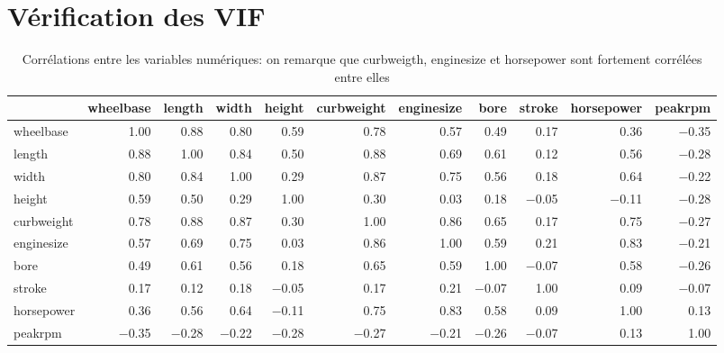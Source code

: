 \documentclass[11pt,a4paper]{article}
\begin{document}
\section{Vérification des VIF}
\begin{table}[h]
	\scriptsize
	\centering
	\begin{tabulary}{1\textwidth}{|L|R|R|R|R|R|R|R|R|R|R|}
	\hline
 &    wheelbase &    length &    width &    height &    curbweight &    enginesize &    bore &    stroke &    horsepower &    peakrpm\\\hline

wheelbase &    1.00 &    0.88 &    0.80 &    0.59 &    0.78 &    0.57 &    0.49 &    0.17 &    0.36 &    $-$0.35\\\hline
length &    0.88 &    1.00 &    0.84 &    0.50 &    0.88 &    0.69 &    0.61 &    0.12 &    0.56 &    $-$0.28\\\hline
width &    0.80 &    0.84 &    1.00 &    0.29 &    0.87 &    0.75 &    0.56 &    0.18 &    0.64 &    $-$0.22\\\hline
height &    0.59 &    0.50 &    0.29 &    1.00 &    0.30 &    0.03 &    0.18 &    $-$0.05 &    $-$0.11 &    $-$0.28\\\hline
curbweight &    0.78 &    0.88 &    0.87 &    0.30 &    1.00 &    0.86 &    0.65 &    0.17 &    0.75 &    $-$0.27\\\hline
enginesize &    0.57 &    0.69 &    0.75 &    0.03 &    0.86 &    1.00 &    0.59 &    0.21 &    0.83 &    $-$0.21\\\hline
bore &    0.49 &    0.61 &    0.56 &    0.18 &    0.65 &    0.59 &    1.00 &    $-$0.07 &    0.58 &    $-$0.26\\\hline
stroke &    0.17 &    0.12 &    0.18 &    $-$0.05 &    0.17 &    0.21 &    $-$0.07 &    1.00 &    0.09 &    $-$0.07\\\hline
horsepower &    0.36 &    0.56 &    0.64 &    $-$0.11 &    0.75 &    0.83 &    0.58 &    0.09 &    1.00 &    0.13\\\hline
peakrpm &    $-$0.35 &    $-$0.28 &    $-$0.22 &    $-$0.28 &    $-$0.27 &    $-$0.21 &    $-$0.26 &    $-$0.07 &    0.13 &    1.00\\\hline

	
\end{tabulary}
			\caption{Corrélations entre les variables numériques: on remarque que curbweigth, enginesize et horsepower sont fortement corrélées entre elles}
			\label{table:corrvif}
		\end{table}
\FloatBarrier
\end{document}
